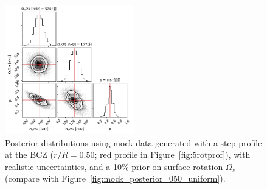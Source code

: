 \begin{figure}
\centering
    \includegraphics[width=0.5\textwidth]{Figures/subgiant_chapter_figures/20.5_corner.png}
    \caption{Posterior distributions using mock data generated with a step profile at the BCZ ($r/R = 0.50$; red profile in Figure~\ref{fig:5rotprof}), with realistic uncertainties, and a 10\% prior on surface rotation $\Omega_s$ (compare with Figure~\ref{fig:mock_posterior_050_uniform}).}
    \label{fig:mock_posterior_050_reject}
\end{figure}
\bsp	%
\label{lastpage}